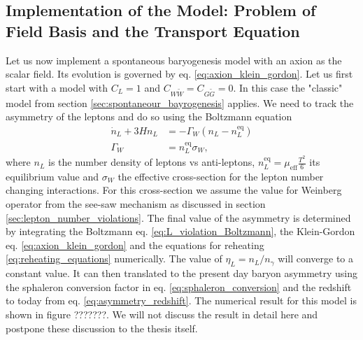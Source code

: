 \documentclass[13pt,a4paper,twoside,titlepage]{article}
\begin{document}
\subsection{Implementation of the Model: Problem of Field Basis and the Transport Equation}
\label{sec:model}

Let us now implement a spontaneous baryogenesis model with an axion as the scalar field.
Its evolution is governed by eq. \eqref{eq:axion_klein_gordon}.
Let us first start with a model with $C_L = 1$ and $C_{W \tilde{W}} = C_{G \tilde{G}} = 0$.
In this case the "classic" model from section \ref{sec:spontaneour_bayrogenesis} applies.
We need to track the asymmetry of the leptons and do so using the Boltzmann equation \cite[eq. 7]{Axion_leptogenesis_Kusenko_2015}
\begin{align}
    \label{eq:L_violation_Boltzmann}
    \dot{n}_L + 3 H n_L &= - \Gamma_W (n_L - n_L^\mathrm{eq}) \\
    \Gamma_W &= n^\mathrm{eq}_L \sigma_W,
\end{align}
where $n_L$ is the number density of leptons vs anti-leptons, $n_L^\mathrm{eq} = \mu_\mathrm{eff} \frac{T^2}{6}$ its equilibrium value and $\sigma_W$ the effective cross-section for the lepton number
changing interactions. For this cross-section we assume the value for Weinberg operator from the see-saw mechanism as discussed in section \ref{sec:lepton_number_violations}.
The final value of the asymmetry is determined by integrating the Boltzmann eq. \eqref{eq:L_violation_Boltzmann}, the Klein-Gordon eq. \eqref{eq:axion_klein_gordon} and the
equations for reheating \eqref{eq:reheating_equations} numerically.
The value of $\eta_L = n_L / n_\gamma$ will converge to
a constant value. It can then translated to
the present day baryon asymmetry using the sphaleron conversion factor in eq. \eqref{eq:sphaleron_conversion} and the redshift to today from eq. \eqref{eq:asymmetry_redshift}.
The numerical result for this model is shown in figure ???????.
We will not discuss the result in detail here and postpone these discussion to the thesis itself.
\end{document}

